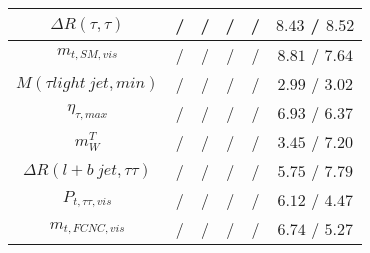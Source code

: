 \begin{tabular}{|c|c|c|c|c|c|}
$\Delta R(\tau ,\tau )$ &  / &  / &  / &  / & $8.43$ / $8.52$\\\hline
$m_{t,SM,vis}$ &  / &  / &  / &  / & $8.81$ / $7.64$\\\hline
$M(\tau  light~jet,min)$ &  / &  / &  / &  / & $2.99$ / $3.02$\\\hline
$\eta_{\tau ,max}$ &  / &  / &  / &  / & $6.93$ / $6.37$\\\hline
$m^{T}_{W}$ &  / &  / &  / &  / & $3.45$ / $7.20$\\\hline
$\Delta R(l+b~jet,\tau \tau )$ &  / &  / &  / &  / & $5.75$ / $7.79$\\\hline
$P_{t,\tau \tau ,vis}$ &  / &  / &  / &  / & $6.12$ / $4.47$\\\hline
$m_{t,FCNC,vis}$ &  / &  / &  / &  / & $6.74$ / $5.27$\\\hline
\end{tabular}
